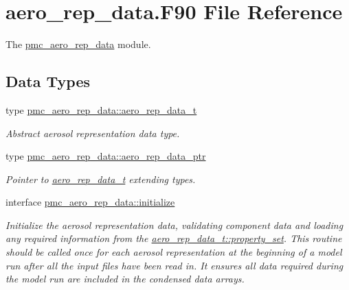 \hypertarget{aero__rep__data_8_f90}{}\section{aero\+\_\+rep\+\_\+data.\+F90 File Reference}
\label{aero__rep__data_8_f90}


The \mbox{\hyperlink{namespacepmc__aero__rep__data}{pmc\+\_\+aero\+\_\+rep\+\_\+data}} module.  


\subsection*{Data Types}
\begin{DoxyCompactItemize}
\item 
type \mbox{\hyperlink{structpmc__aero__rep__data_1_1aero__rep__data__t}{pmc\+\_\+aero\+\_\+rep\+\_\+data\+::aero\+\_\+rep\+\_\+data\+\_\+t}}
\begin{DoxyCompactList}\small\item\em Abstract aerosol representation data type. \end{DoxyCompactList}\item 
type \mbox{\hyperlink{structpmc__aero__rep__data_1_1aero__rep__data__ptr}{pmc\+\_\+aero\+\_\+rep\+\_\+data\+::aero\+\_\+rep\+\_\+data\+\_\+ptr}}
\begin{DoxyCompactList}\small\item\em Pointer to \mbox{\hyperlink{structpmc__aero__rep__data_1_1aero__rep__data__t}{aero\+\_\+rep\+\_\+data\+\_\+t}} extending types. \end{DoxyCompactList}\item 
interface \mbox{\hyperlink{interfacepmc__aero__rep__data_1_1initialize}{pmc\+\_\+aero\+\_\+rep\+\_\+data\+::initialize}}
\begin{DoxyCompactList}\small\item\em Initialize the aerosol representation data, validating component data and loading any required information from the {\ttfamily \mbox{\hyperlink{structpmc__aero__rep__data_1_1aero__rep__data__t_a87b1bf5cd10a0a2b51390fb24ebf56c5}{aero\+\_\+rep\+\_\+data\+\_\+t\+::property\+\_\+set}}}. This routine should be called once for each aerosol representation at the beginning of a model run after all the input files have been read in. It ensures all data required during the model run are included in the condensed data arrays. \end{DoxyCompactList}\item 

\end{DoxyCompactItemize}
